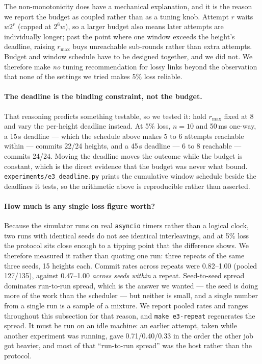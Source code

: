 \documentclass{llncs}
\begin{document}
The non-monotonicity does have a mechanical explanation, and it is the reason we
report the budget as coupled rather than as a tuning knob. Attempt $r$ waits
$w 2^{r}$ (capped at $2^6 w$), so a larger budget also means later attempts are
individually longer; past the point where one window exceeds the height's
deadline, raising $r_{\max}$ buys unreachable sub-rounds rather than extra
attempts. Budget and window schedule have to be designed together, and we did
not. We therefore make \emph{no} tuning recommendation for lossy links beyond
the observation that none of the settings we tried makes 5\% loss reliable.

\paragraph{The deadline is the binding constraint, not the budget.}
That reasoning predicts something testable, so we tested it: hold $r_{\max}$
fixed at 8 and vary the per-height deadline instead. At 5\% loss, $n=10$ and
50\,ms one-way, a 15\,s deadline --- which the schedule above makes 5 to 6
attempts reachable within --- commits 22/24 heights, and a 45\,s deadline ---
6 to 8 reachable --- commits 24/24. Moving the deadline moves the outcome
while the budget is constant, which is the direct evidence that the budget was
never what bound. \texttt{experiments/e3\_deadline.py} prints the cumulative
window schedule beside the deadlines it tests, so the arithmetic above is
reproducible rather than asserted.

\paragraph{How much is any single loss figure worth?}
Because the simulator runs on real \texttt{asyncio} timers rather than a logical
clock, two runs with identical seeds do not see identical interleavings, and at
5\% loss the protocol sits close enough to a tipping point that the difference
shows. We therefore measured it rather than quoting one run: three repeats of
the same three seeds, 15 heights each. Commit rates across repeats were
0.82--1.00 (pooled 127/135), against 0.47--1.00 \emph{across seeds within} a
repeat. Seed-to-seed spread dominates run-to-run spread, which is the answer we
wanted --- the seed is doing more of the work than the scheduler --- but neither
is small, and a single number from a single run is a sample of a mixture. We
report pooled rates and ranges throughout this subsection for that reason, and
\texttt{make e3-repeat} regenerates the spread. It must be run on an idle
machine: an earlier attempt, taken while another experiment was running, gave
0.71/0.40/0.33 in the order the other job got heavier, and most of that
``run-to-run spread'' was the host rather than the protocol.
\end{document}
